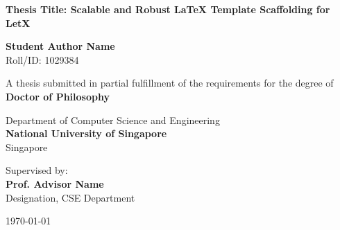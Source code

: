 \begin{titlepage}
\begin{center}
    \vspace*{1cm}
    
    
    \vspace{1.5cm}
    
    {\huge \bfseries \color{primary} Thesis Title: Scalable and Robust LaTeX Template Scaffolding for LetX}
    
    \vspace{1.5cm}
    
    {\Large \bfseries Student Author Name} \\
    \vspace{0.2cm}
    {Roll/ID: 1029384}
    
    \vspace{1.5cm}
    
    {A thesis submitted in partial fulfillment of the requirements for the degree of} \\
    \vspace{0.3cm}
    {\large \bfseries \color{secondary} Doctor of Philosophy}
    
    \vspace{1.5cm}
    
    {Department of Computer Science and Engineering} \\
    \vspace{0.2cm}
    {\large \bfseries \color{primary} National University of Singapore} \\
    \vspace{0.1cm}
    {Singapore}
    
    \vfill
    
    {Supervised by:} \\
    {\large \bfseries Prof. Advisor Name} \\
    {Designation, CSE Department}
    
    \vspace{1cm}
    
    {\large \today}
    
\end{center}
\end{titlepage}
